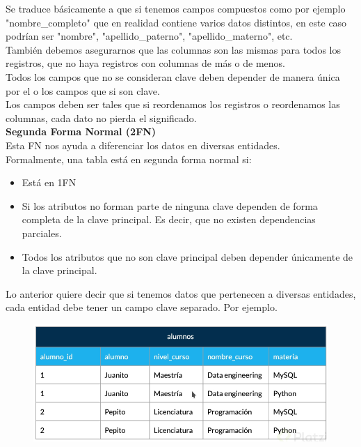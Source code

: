 \documentclass{article}
\begin{document}
Se traduce básicamente a que si tenemos campos compuestos como por ejemplo
"nombre\_completo" que en realidad contiene varios datos distintos, en este
caso podrían ser "nombre", "apellido\_paterno", "apellido\_materno", etc.\\

También debemos asegurarnos que las columnas son las mismas para todos los
registros, que no haya registros con columnas de más o de menos.\\

Todos los campos que no se consideran clave deben depender de manera única por
el o los campos que si son clave.\\

Los campos deben ser tales que si reordenamos los registros o reordenamos las
columnas, cada dato no pierda el significado.\\

\textbf{Segunda Forma Normal (2FN)}\\
Esta FN nos ayuda a diferenciar los datos en diversas entidades.\\

Formalmente, una tabla está en segunda forma normal si:
\begin{itemize}
  \item Está en 1FN
  \item Si los atributos no forman parte de ninguna clave dependen de forma
    completa de la clave principal. Es decir, que no existen dependencias
    parciales.
  \item Todos los atributos que no son clave principal deben depender
    únicamente de la clave principal.
\end{itemize}

Lo anterior quiere decir que si tenemos datos que pertenecen a diversas
entidades, cada entidad debe tener un campo clave separado. Por ejemplo.

\begin{figure}[h!]
    \centering
      \includegraphics[scale=0.5]{./Pictures/029_normalizacion.png}
\end{figure}
\end{document}
